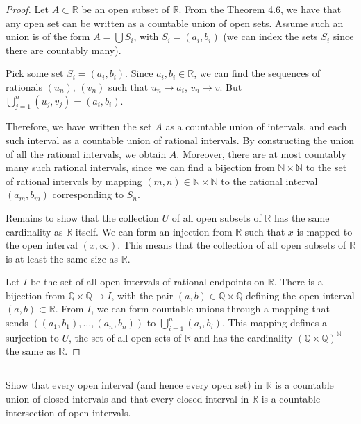 \begin{proof}

Let $A \subset \mathbb{R}$ be an open subset of $\mathbb{R}$. From the Theorem 4.6, we have that any open set can be written as a countable union of open sets. Assume such an union is of the form $A = \bigcup S_i$, with $S_i = (a_i, b_i)$ (we can index the sets $S_i$ since there are countably many).

Pick some set $S_i = (a_i, b_i)$. Since $a_i, b_i \in \mathbb{R}$, we can find the sequences of rationals $(u_n)$, $(v_n)$ such that $u_n \rightarrow a_i$, $v_n \rightarrow v$. But $\bigcup_{j=1}^n (u_j, v_j) = (a_i, b_i)$.

Therefore, we have written the set $A$ as a countable union of intervals, and each such interval as a countable union of rational intervals. By constructing the union of all the rational intervals, we obtain $A$. Moreover, there are at most countably many such rational intervals, since we can find a bijection from $\mathbb{N} \times \mathbb{N}$ to the set of rational intervals by mapping $(m, n) \in \mathbb{N} \times \mathbb{N}$ to the rational interval $(a_m, b_m)$ corresponding to $S_n$.

Remains to show that the collection $U$ of all open subsets of $\mathbb{R}$ has the same cardinality as $\mathbb{R}$ itself. We can form an injection from $\mathbb{R}$ such that $x$ is mapped to the open interval $(x, \infty)$. This means that the collection of all open subsets of $\mathbb{R}$ is at least the same size as $\mathbb{R}$.

Let $I$ be the set of all open intervals of rational endpoints on $\mathbb{R}$. There is a bijection from $\mathbb{Q} \times \mathbb{Q} \rightarrow I$, with the pair $(a,b) \in \mathbb{Q} \times \mathbb{Q}$ defining the open interval $(a,b) \subset \mathbb{R}$. From $I$, we can form countable unions through a mapping that sends $((a_1, b_1), \dots, (a_n, b_n))$ to $\bigcup_{i=1}^n (a_i, b_i)$. This mapping defines a surjection to $U$, the set of all open sets of $\mathbb{R}$ and has the cardinality $(\mathbb{Q} \times \mathbb{Q})^\mathbb{N}$ - the same as $\mathbb{R}$.

\end{proof}



\subsection{} Show that every open interval (and hence every open set) in $\mathbb{R}$ is a countable union of closed intervals and that every closed interval in $\mathbb{R}$ is a countable intersection of open intervals.


